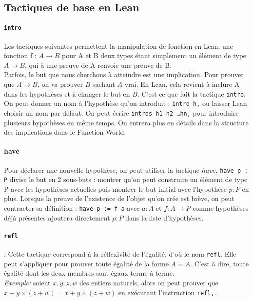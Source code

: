 \subsection{Tactiques de base en Lean}


\paragraph{\texttt{intro}}
Les tactiques suivantes permettent la manipulation de fonction en Lean, une fonction f : $A\to B$ pour A et B deux types étant simplement un élément de type $A\to B$, qui à une preuve de A renvoie une preuve de B.\\

Parfois, le but que nous cherchons à atteindre est une implication. Pour prouver que $A \to B$, on va prouver $B$ sachant $A$ vrai. En Lean, cela revient à inclure A dans les hypothèses et à changer le but en $B$. C'est ce que fait la tactique \texttt{intro}. On peut donner un nom à l'hypothèse qu'on introduit : \texttt{intro h,} ou laisser Lean choisir un nom par défaut.
On peut écrire \texttt{intros h1 h2 \ldots hn,} pour introduire plusieurs hypothèses en même temps.
On entrera plus en détails dans la structure des implications dans le Function World.

\paragraph{have}

Pour déclarer une nouvelle hypothèse, on peut utiliser la tactique $have$.
\texttt{have p : P} divise le but en 2 sous-buts : montrer qu'on peut construire un élément de type P avec les hypothèses actuelles puis montrer le but initial avec l'hypothèse $p : P$ en plus.
Lorsque la preuve de l'existence de l'objet qu'on crée est brève, on peut contracter sa définition :
\texttt{have p := f a} avec $a : A$ et $f : A \to P$ comme hypothèses déjà présentes ajoutera directement $p : P$ dans la liste d'hypothèses.  


\paragraph { \texttt{refl}}: Cette tactique correspond à la réflexivité de l'égalité, d'où le nom \texttt{refl}. Elle peut s'appliquer pour prouver toute égalité de la forme $A=A$. C'est à dire, toute égalité dont les deux membres sont égaux terme à terme. \\
\textit{Exemple:} soient $x,y,z,w$ des entiers naturels, alors on peut prouver que $x+y \times (z+w)=x+y \times (z+w)$ en exécutant l'instruction \texttt{refl,}.
